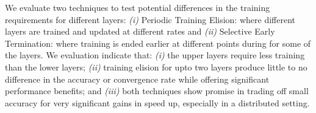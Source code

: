 We evaluate two techniques to test potential differences in the training requirements for different layers: \emph{(i)} Periodic Training Elision: where different layers are trained and updated at different rates and \emph{(ii)} Selective Early Termination: where training is ended earlier at different points during for some of the layers. We evaluation indicate that: \emph{(i)} the upper layers require less training than the lower layers; \emph{(ii)} training elision for upto two layers produce little to no difference in the accuracy or convergence rate while offering significant performance benefits; and \emph{(iii)} both techniques show promise in trading off small accuracy for very significant gains in speed up, especially in a distributed setting. 

